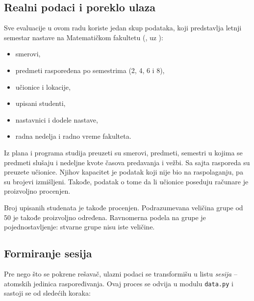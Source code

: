 \documentclass[12pt,oneside]{memoir}
\begin{document}
\subsection{Realni podaci i poreklo ulaza}
\label{sec:poreklo_podataka}

Sve evaluacije u ovom radu koriste jedan skup podataka, koji
predstavlja letnji semestar nastave na Matematičkom fakultetu
(, uz ):

\begin{itemize}
\item smerovi,
\item predmeti raspoređena po semestrima (2, 4, 6 i 8),
\item učionice i lokacije,
\item upisani studenti,
\item nastavnici i dodele nastave,
\item radna nedelja i radno vreme fakulteta.
\end{itemize}

Iz plana i programa studija preuzeti su
smerovi, predmeti, semestri u kojima se predmeti slušaju i nedeljne
kvote časova predavanja i vežbi. Sa sajta rasporeda su preuzete učionice.
Njihov kapacitet je podatak koji nije bio na raspolaganju, pa su brojevi izmišljeni.
Takođe, podatak o tome da li učionice poseduju računare je proizvoljno procenjen.

Broj upisanih studenata je takođe procenjen. Podrazumevana veličina grupe od 50 je takođe
proizvoljno određena. Ravnomerna podela na grupe je pojednostavljenje:
stvarne grupe nisu iste veličine.

\subsection{Formiranje sesija}
\label{sec:sesije}

Pre nego što se pokrene rešavač, ulazni podaci se transformišu u
listu \emph{sesija} -- atomskih jedinica raspoređivanja. Ovaj
proces se odvija u modulu \texttt{data.py} i sastoji se od
sledećih koraka:
\end{document}

